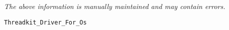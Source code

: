 \label{pkg:threadkit\_driver\_for\_posix}

{\tiny \it The above information is manually maintained and may contain errors.}
\begin{verbatim}
Threadkit_Driver_For_Os
\end{verbatim}

